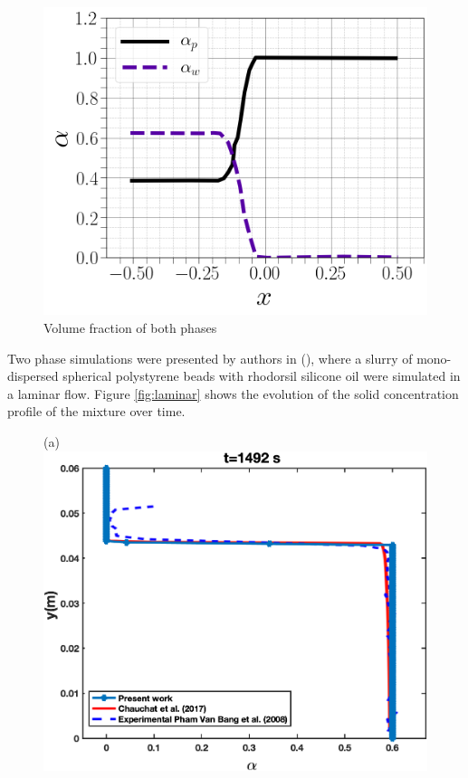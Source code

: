 \documentclass[review,3p,times,12pt]{elsarticle}
\begin{document}
\begin{minipage}{0.4\textwidth}
\begin{figure}[H]
\begin{center}
%
\includegraphics[trim=0cm 0cm 0cm 0cm,clip,scale=0.25]{figs/5.png}
\caption{ \footnotesize { Volume fraction of both phases }}
\label{fig:gauss}
\end{center}
\end{figure} 
\end{minipage}
\begin{center}
\end{center}
Two phase simulations were presented by authors in (\citet{elkarii2020towards}), where a slurry of mono-dispersed spherical polystyrene beads with rhodorsil silicone oil were simulated in a laminar flow. Figure \ref{fig:laminar} shows the evolution of the solid concentration profile of the mixture over time.\\
\begin{minipage}[t]{0.5\textwidth}
\begin{figure}[H]
\begin{center}
(a)\includegraphics[scale = 0.45]{figs/E4}
\end{center}
\end{figure}
\end{minipage} \hfill 
\end{document}
